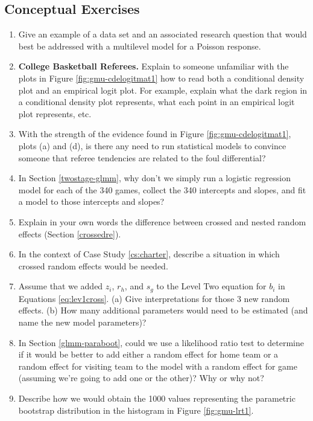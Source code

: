 \documentclass[
]{krantz}
\begin{document}
\hypertarget{conceptual-exercises-3}{%
\subsection{Conceptual Exercises}\label{conceptual-exercises-3}}

\begin{enumerate}
\def\labelenumi{\arabic{enumi}.}
\item
  Give an example of a data set and an associated research question that would best be addressed with a multilevel model for a Poisson response.
\item
  \textbf{College Basketball Referees.} Explain to someone unfamiliar with the plots in Figure \ref{fig:gmu-cdelogitmat1} how to read both a conditional density plot and an empirical logit plot. For example, explain what the dark region in a conditional density plot represents, what each point in an empirical logit plot represents, etc.
\item
  With the strength of the evidence found in Figure \ref{fig:gmu-cdelogitmat1}, plots (a) and (d), is there any need to run statistical models to convince someone that referee tendencies are related to the foul differential?
\item
  In Section \ref{twostage-glmm}, why don't we simply run a logistic regression model for each of the 340 games, collect the 340 intercepts and slopes, and fit a model to those intercepts and slopes?
\item
  Explain in your own words the difference between crossed and nested random effects (Section \ref{crossedre}).
\item
  In the context of Case Study \ref{cs:charter}, describe a situation in which crossed random effects would be needed.
\item
  Assume that we added \(z_{i}\), \(r_{h}\), and \(s_{g}\) to the Level Two equation for \(b_{i}\) in Equations \eqref{eq:lev1cross}. (a) Give interpretations for those 3 new random effects. (b) How many additional parameters would need to be estimated (and name the new model parameters)?
\item
  In Section \ref{glmm-paraboot}, could we use a likelihood ratio test to determine if it would be better to add either a random effect for home team or a random effect for visiting team to the model with a random effect for game (assuming we're going to add one or the other)? Why or why not?
\item
  Describe how we would obtain the 1000 values representing the parametric bootstrap distribution in the histogram in Figure \ref{fig:gmu-lrt1}.

\end{enumerate}
\end{document}
